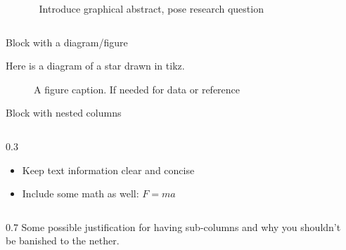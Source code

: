 \documentclass[final, xcolor={table,dvipsnames},t]{beamer}
\newlength{\sepwidthA} %
\newlength{\colwidthA} %
\newcommand{\separatorcolumnA}{\begin{column}{\sepwidthA}\end{column}}
\newlength{\sepwidthB}
\newlength{\colwidthB}
\newcommand{\separatorcolumnB}{\begin{column}{\sepwidthB}\end{column}}
\begin{document}
\begin{frame}[t]
\begin{columns}[t]
    \separatorcolumnA
    \begin{column}{\colwidthA}

        \begin{block}{Introduce graphical abstract, pose research question}
            \blindtext
        \end{block}
    
    \end{column}

    \separatorcolumnA
\end{columns}

\begin{columns}
\separatorcolumnB

    \begin{column}[T]{\colwidthB}

        \begin{block}{Block with a diagram/figure}

        Here is a diagram of a star drawn in tikz.

        \begin{figure}
            \centering
            \caption{A figure caption. If needed for data or reference}
        \end{figure}
    \end{block}
    
    \begin{block}{Block with nested columns}
        \begin{column}{0.3\colwidthB}
            \begin{itemize}
                \item Keep text information clear and concise
                \item Include some math as well: $ F = ma $
            \end{itemize}
        \end{column}
        \begin{column}{0.7\colwidthB}
            Some possible justification for having sub-columns and why you shouldn't be banished to the nether.
            

\end{column}
\end{block}
\end{column}
\end{columns}
\end{frame}
\end{document}
